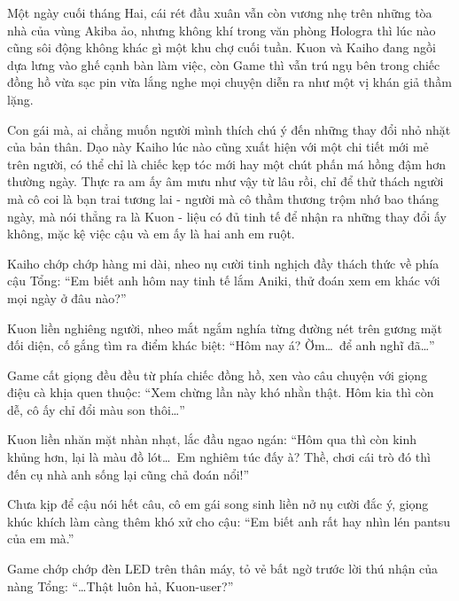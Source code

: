 \documentclass[../main.tex]{subfiles}
\begin{document}

Một ngày cuối tháng Hai, cái rét đầu xuân vẫn còn vương nhẹ trên những tòa nhà của vùng Akiba ảo, nhưng không khí trong văn phòng Hologra thì lúc nào cũng sôi động không khác gì một khu chợ cuối tuần. Kuon và Kaiho đang ngồi dựa lưng vào ghế cạnh bàn làm việc, còn Game thì vẫn trú ngụ bên trong chiếc đồng hồ vừa sạc pin vừa lắng nghe mọi chuyện diễn ra như một vị khán giả thầm lặng.

Con gái mà, ai chẳng muốn người mình thích chú ý đến những thay đổi nhỏ nhặt của bản thân. Dạo này Kaiho lúc nào cũng xuất hiện với một chi tiết mới mẻ trên người, có thể chỉ là chiếc kẹp tóc mới hay một chút phấn má hồng đậm hơn thường ngày. Thực ra am ấy âm mưu như vậy từ lâu rồi, chỉ để thử thách người mà cô coi là bạn trai tương lai - người mà cô thầm thương trộm nhớ bao tháng ngày, mà nói thẳng ra là Kuon - liệu có đủ tinh tế để nhận ra những thay đổi ấy không, mặc kệ việc cậu và em ấy là hai anh em ruột.

Kaiho chớp chớp hàng mi dài, nheo nụ cười tinh nghịch đầy thách thức về phía cậu Tổng: ``Em biết anh hôm nay tinh tế lắm Aniki, thử đoán xem em khác với mọi ngày ở đâu nào?''

Kuon liền nghiêng người, nheo mắt ngắm nghía từng đường nét trên gương mặt đối diện, cố gắng tìm ra điểm khác biệt: ``Hôm nay á? Ờm\dots\ để anh nghĩ đã\dots''

Game cất giọng đều đều từ phía chiếc đồng hồ, xen vào câu chuyện với giọng điệu cà khịa quen thuộc: ``Xem chừng lần này khó nhằn thật. Hôm kia thì còn dễ, cô ấy chỉ đổi màu son thôi\dots''

Kuon liền nhăn mặt nhàn nhạt, lắc đầu ngao ngán: ``Hôm qua thì còn kinh khủng hơn, lại là màu đồ lót\dots\ Em nghiêm túc đấy à? Thề, chơi cái trò đó thì đến cụ nhà anh sống lại cũng chả đoán nổi!''

Chưa kịp để cậu nói hết câu, cô em gái song sinh liền nở nụ cười đắc ý, giọng khúc khích làm càng thêm khó xử cho cậu: ``Em biết anh rất hay nhìn lén pantsu của em mà.''

Game chớp chớp đèn LED trên thân máy, tỏ vẻ bất ngờ trước lời thú nhận của nàng Tổng: ``\dots Thật luôn hả, Kuon-user?''
\end{document}
